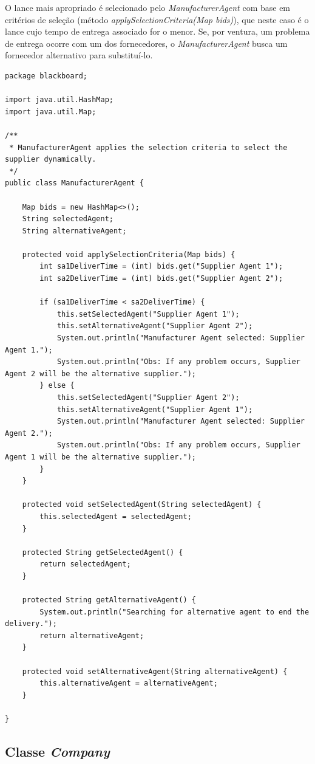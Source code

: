 O lance mais apropriado é selecionado pelo \textit{ManufacturerAgent} com base em critérios de seleção (método \textit{applySelectionCriteria(Map bids)}), que neste caso é o lance cujo tempo de entrega associado for o menor. Se, por ventura, um problema de entrega ocorre com um dos fornecedores, o \textit{ManufacturerAgent} busca um fornecedor alternativo para substituí-lo. 

\begin{lstlisting}
package blackboard;

import java.util.HashMap;
import java.util.Map;

/**
 * ManufacturerAgent applies the selection criteria to select the supplier dynamically.
 */
public class ManufacturerAgent {

	Map bids = new HashMap<>();
	String selectedAgent;
	String alternativeAgent;
	
	protected void applySelectionCriteria(Map bids) {
		int sa1DeliverTime = (int) bids.get("Supplier Agent 1");
		int sa2DeliverTime = (int) bids.get("Supplier Agent 2");
		
		if (sa1DeliverTime < sa2DeliverTime) {
			this.setSelectedAgent("Supplier Agent 1");
			this.setAlternativeAgent("Supplier Agent 2");
			System.out.println("Manufacturer Agent selected: Supplier Agent 1.");
			System.out.println("Obs: If any problem occurs, Supplier Agent 2 will be the alternative supplier.");
		} else {
			this.setSelectedAgent("Supplier Agent 2");
			this.setAlternativeAgent("Supplier Agent 1");
			System.out.println("Manufacturer Agent selected: Supplier Agent 2.");
			System.out.println("Obs: If any problem occurs, Supplier Agent 1 will be the alternative supplier.");
		}
	}
	
	protected void setSelectedAgent(String selectedAgent) {
		this.selectedAgent = selectedAgent;
	}

	protected String getSelectedAgent() {
		return selectedAgent;
	}

	protected String getAlternativeAgent() {
		System.out.println("Searching for alternative agent to end the delivery.");
		return alternativeAgent;
	}

	protected void setAlternativeAgent(String alternativeAgent) {
		this.alternativeAgent = alternativeAgent;
	}
	 
}
\end{lstlisting}

\subsection{Classe \textit{Company}}

